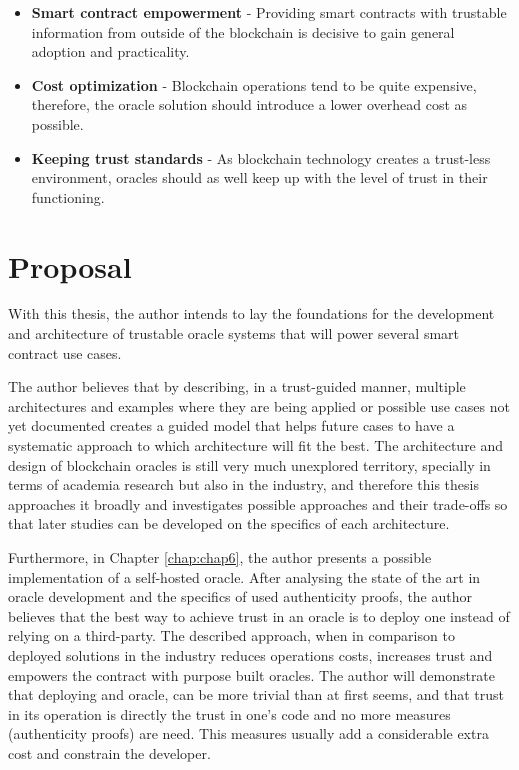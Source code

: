 
\begin{itemize}
    \item \textbf{Smart contract empowerment} - Providing smart contracts with trustable information from outside of the blockchain is decisive to gain general adoption and practicality.
    \item \textbf{Cost optimization} - Blockchain operations tend to be quite expensive, therefore, the oracle solution should introduce a lower overhead cost as possible.
    \item \textbf{Keeping trust standards} - As blockchain technology creates a trust-less environment, oracles should as well keep up with the level of trust in their functioning.
\end{itemize}

\section{Proposal}

With this thesis, the author intends to lay the foundations for the development and architecture of trustable oracle systems that will power several smart contract use cases.

The author believes that by describing, in a trust-guided manner, multiple architectures and examples where they are being applied or possible use cases not yet documented creates a guided model that helps future cases to have a systematic approach to which architecture will fit the best. The architecture and design of blockchain oracles is still very much unexplored territory, specially in terms of academia research but also in the industry, and therefore this thesis approaches it broadly and investigates possible approaches and their trade-offs so that later studies can be developed on the specifics of each architecture.


Furthermore, in Chapter \ref{chap:chap6}, the author presents a possible implementation of a self-hosted oracle. After analysing the state of the art in oracle development and the specifics of used authenticity proofs, the author believes that the best way to achieve trust in an oracle is to deploy one instead of relying on a third-party. The described approach, when in comparison to deployed solutions in the industry reduces operations costs, increases trust and empowers the contract with purpose built oracles. The author will demonstrate that deploying and oracle, can be more trivial than at first seems, and that trust in its operation is directly the trust in one's code and no more measures (authenticity proofs) are need. This measures usually add a considerable extra cost and constrain the developer.


